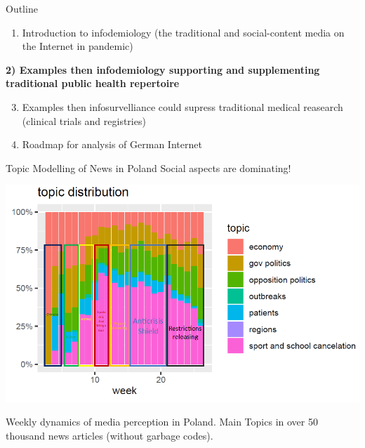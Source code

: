\documentclass[
  10pt,
  ignorenonframetext,
  a4paper,handout]{beamer}
\providecommand{\tightlist}{%
  \setlength{\itemsep}{0pt}\setlength{\parskip}{0pt}}
\begin{document}
\begin{frame}{Outline}
\protect\hypertarget{outline-1}{}
\Large
\pause

\begin{enumerate}
[1)]
\tightlist
\item
  Introduction to infodemiology (the traditional and social-content
  media on the Internet in pandemic)
\end{enumerate}

\textbf{2) Examples then infodemiology supporting and supplementing
traditional public health repertoire}

\begin{enumerate}
[1)]
\setcounter{enumi}{2}
\item
  Examples then infosurvelliance could supress traditional medical
  reasearch (clinical trials and registries)
\item
  Roadmap for analysis of German Internet
\end{enumerate}

\large

\pause
\end{frame}

\begin{frame}{Topic Modelling of News in Poland}
\protect\hypertarget{topic-modelling-of-news-in-poland}{}
Social aspects are dominating!

\begin{center}\includegraphics[width=1\linewidth]{top} \end{center}

Weekly dynamics of media perception in Poland. Main Topics in over 50
thousand news articles (without garbage codes).
\end{frame}
\end{document}
